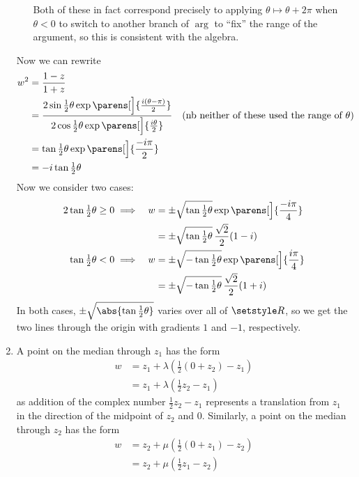\documentclass[fleqn,a4paper,11pt]{article}
\begin{document}
\begin{enumerate}
\begin{enumerate}[(i)]
      Both of these in fact correspond precisely to applying
      \(\theta \mapsto \theta + 2\pi\) when \(\theta < 0\) to switch to another
      branch of \(\arg\) to ``fix'' the range of the argument, so this is
      consistent with the algebra.
    \end{enumerate}
    Now we can rewrite
    \begin{align*}
     w^2 &= \frac{1 - z}{1 + z} \\
         &= \frac
             {2 \sin \tfrac 12 \theta \exp\parens[\Big]{\frac{i(\theta - \pi)}2}
             }
             {2 \cos \tfrac 12 \theta \exp\parens[\Big]{\frac{i\theta}2}} \quad
             \text{(nb neither of these used the range of
                   \(\theta\))} \\
         &= \tan \tfrac 12 \theta \exp\parens[\Big]{\frac{-i\pi}2} \\
         &= -i \tan \tfrac 12 \theta
    \end{align*}
    Now we consider two cases:
    \begin{alignat*}2
     \tan \tfrac 12 \theta &\ge 0 \implies&
      w &= \pm \sqrt{\tan \tfrac 12 \theta} \exp\parens[\Big]{\frac{-i\pi}4} \\
     && &= \pm \sqrt{\tan \tfrac 12 \theta} \,\frac{\sqrt 2}2 (1 - i) \\
     \tan \tfrac 12 \theta &< 0 \implies&
      w &= \pm \sqrt{-\tan \tfrac 12 \theta} \exp\parens[\Big]{\frac{i\pi}4} \\
     && &= \pm \sqrt{-\tan \tfrac 12 \theta} \,\frac{\sqrt 2}2 (1 + i)
    \end{alignat*}
    In both cases, \(\pm\sqrt{\abs{\tan \frac 12 \theta}}\) varies over all of
    \(\Reals\), so we get the two lines through the origin with gradients \(1\)
    and \(-1\), respectively.
   \item A point on the median through \(z_1\) has the form
    \begin{align*}
     w &= z_1 + \lambda (\tfrac 12 (0 + z_2) - z_1) \\
       &= z_1 + \lambda (\tfrac 12 z_2 - z_1)
    \end{align*}
    as addition of the complex number \(\frac 12 z_2 - z_1\) represents a
    translation from \(z_1\) in the direction of the midpoint of \(z_2\) and
    \(0\). Similarly, a point on the median through \(z_2\) has the form
    \begin{align*}
     w &= z_2 + \mu (\tfrac 12 (0 + z_1) - z_2) \\
       &= z_2 + \mu (\tfrac 12 z_1 - z_2)

\end{align*}
\end{enumerate}
\end{document}
